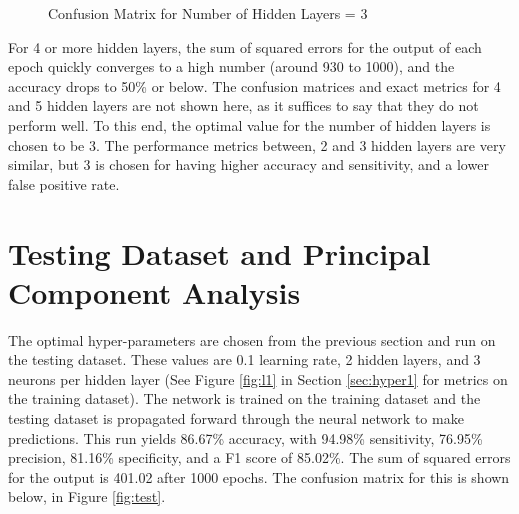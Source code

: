 \documentclass[tikz]{article}
\begin{document}
\begin{figure}[H]
\begin{center}
\caption{Confusion Matrix for Number of Hidden Layers = 3}
\label{fig:nhl3}
\end{center}
\end{figure}

For 4 or more hidden layers, the sum of squared errors for the output of each epoch quickly converges to a high number (around 930 to 1000), and the accuracy drops to 50\% or below. The confusion matrices and exact metrics for 4 and 5 hidden layers are not shown here, as it suffices to say that they do not perform well. To this end, the optimal value for the number of hidden layers is chosen to be 3. The performance metrics between, 2 and 3 hidden layers are very similar, but 3 is chosen for having higher accuracy and sensitivity, and a lower false positive rate. 


\section{Testing Dataset and Principal Component Analysis}
\label{sec:pca}
The optimal hyper-parameters are chosen from the previous section and run on the testing dataset. These values are 0.1 learning rate, 2 hidden layers, and 3 neurons per hidden layer (See Figure \ref{fig:l1} in Section \ref{sec:hyper1} for metrics on the training dataset). The network is trained on the training dataset and the testing dataset is propagated forward through the neural network to make predictions. This run yields 86.67\% accuracy, with 94.98\% sensitivity, 76.95\% precision, 81.16\% specificity, and a F1 score of 85.02\%. The sum of squared errors for the output is 401.02 after 1000 epochs. The confusion matrix for this is shown below, in Figure \ref{fig:test}.
\end{document}
